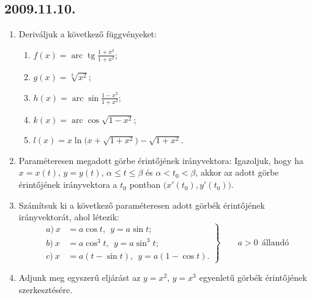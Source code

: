 \documentclass{article}
\newenvironment{abc}{\begin{enumerate}[label=\textit{\alph*})]}{\end{enumerate}}
\newcommand{\tg}{\mathop{\mathrm{tg}}\nolimits}
\newcommand{\arc}{\mathop{\mathrm{arc}}\nolimits}
\renewcommand{\arcsin}{\arc\sin}
\renewcommand{\arccos}{\arc\cos}
\newcommand{\arctg}{\arc\tg}
\begin{document}
\subsection*{2009.11.10.}
\begin{enumerate}
\item Deriváljuk a következő függvényeket:
	\begin{abc}
	\item $f(x)=\arctg \frac{1+x^3}{1+x^2}$;
	\item $g(x)=\sqrt[3]{x^2}$;
	\item $h(x)=\arcsin \frac{1-x^2}{1+x^2}$;
	\item $k(x)=\arccos \sqrt{1-x^2}$;
	\item $l(x)=x \ln \big(x+\sqrt{1+x^2}\big)-\sqrt{1+x^2}$.
	\end{abc}
\item Paraméteresen megadott görbe érintőjének irányvektora: Igazoljuk, hogy ha $x=x(t)$, 		$y=y(t)$, $\alpha \leq t \leq \beta$ és $\alpha <t_0 < \beta$, akkor az adott görbe 		érintőjének irányvektora a $t_0$ pontban $\Big(x'(t_0),y'(t_0)\Big)$.
\item Számítsuk ki a következő paraméteresen adott görbék érintőjének irányvektorát, ahol 		létezik: 
	\begin{equation}
 	\left.\begin{aligned}
	        a) ~x&= a \cos t,~~y=a \sin t; \\
	        b)~x&=a \cos^3 t,~~y=a \sin^3 t;\\
	        c)~x&=a(t-\sin t),~~y= a(1-\cos t).
	       \end{aligned}
	 \right\}
	 \qquad a>0~~ \text{állandó}
\end{equation}
\item Adjunk meg egyszerű eljárást az $y=x^2$, $y=x^3$ egyenletű görbék érintőjének szerkesztésére.
\end{enumerate}
\end{document}
